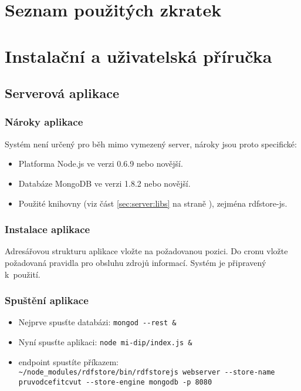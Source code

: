 \chapter{Seznam použitých zkratek}
\renewcommand{\glossarysection}[2][]{}
\printglossary[type=acronym]






\chapter{Instalační a uživatelská příručka}
\section{Serverová aplikace}
\subsection{Nároky aplikace}
Systém není určený pro běh mimo vymezený server, nároky jsou proto specifické:
\begin{itemize}
 \item Platforma Node.js ve verzi 0.6.9 nebo novější.
 \item Databáze MongoDB ve verzi 1.8.2 nebo novější.
 \item Použité knihovny (viz část \ref{sec:server:libs} na straně \pageref{sec:server:libs}), zejména rdfstore-js.
\end{itemize}

\subsection{Instalace aplikace}
Adresářovou strukturu aplikace vložte na požadovanou pozici. Do cronu vložte požadovaná pravidla pro obsluhu zdrojů informací. Systém je připravený k~použití.

\subsection{Spuštění aplikace}
\begin{itemize}
 \item Nejprve spusťte databázi: \texttt{mongod -{}-rest \&}
 \item Nyní spusťte aplikaci: \texttt{node mi-dip/index.js \&}
 \item {} endpoint spustíte příkazem: \\ \texttt{\textasciitilde /node\_modules/rdfstore/bin/rdfstorejs webserver \linebreak -{}-store-name pruvodcefitcvut -{}-store-engine mongodb -p 8080}
\end{itemize}

